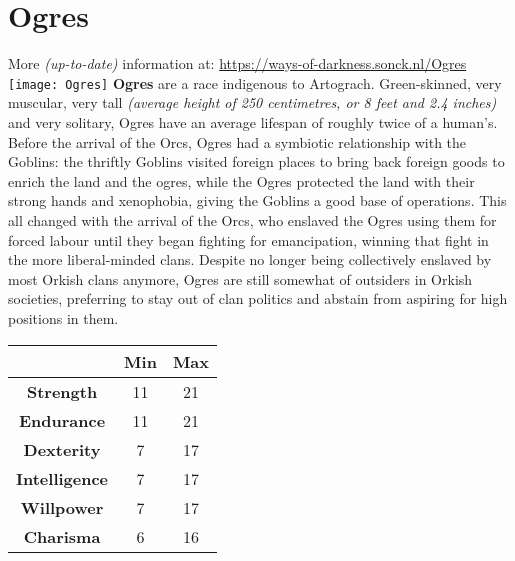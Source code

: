 \documentclass[openany,10pt,a4paper]{book}
\begin{document}
\section{Ogres}
More \textit{(up-to-date)} information at: \url{https://ways-of-darkness.sonck.nl/Ogres}\newline
\texttt{[image: Ogres]}\newline
\textbf{Ogres} are a race indigenous to Artograch. Green-skinned, very muscular, very tall \textit{(average height of 250 centimetres, or 8 feet and 2.4 inches)} and very solitary, Ogres have an average lifespan of roughly twice of a human's. Before the arrival of the Orcs, Ogres had a symbiotic relationship with the Goblins: the thriftly Goblins visited foreign places to bring back foreign goods to enrich the land and the ogres, while the Ogres protected the land with their strong hands and xenophobia, giving the Goblins a good base of operations. This all changed with the arrival of the Orcs, who enslaved the Ogres using them for forced labour until they began fighting for emancipation, winning that fight in the more liberal-minded clans. Despite no longer being collectively enslaved by most Orkish clans anymore, Ogres are still somewhat of outsiders in Orkish societies, preferring to stay out of clan politics and abstain from aspiring for high positions in them.\newline
\begin{tabular}{|c|c|c|}
\hline
 & \textbf{Min} & \textbf{Max} \\ \hline
\textbf{Strength} & 11 & 21 \\ \hline
\textbf{Endurance} & 11 & 21 \\ \hline
\textbf{Dexterity} & 7 & 17 \\ \hline
\textbf{Intelligence} & 7 & 17 \\ \hline
\textbf{Willpower} & 7 & 17 \\ \hline
\textbf{Charisma} & 6 & 16 \\ \hline
\end{tabular}\newline
{}\newpage
\end{document}
